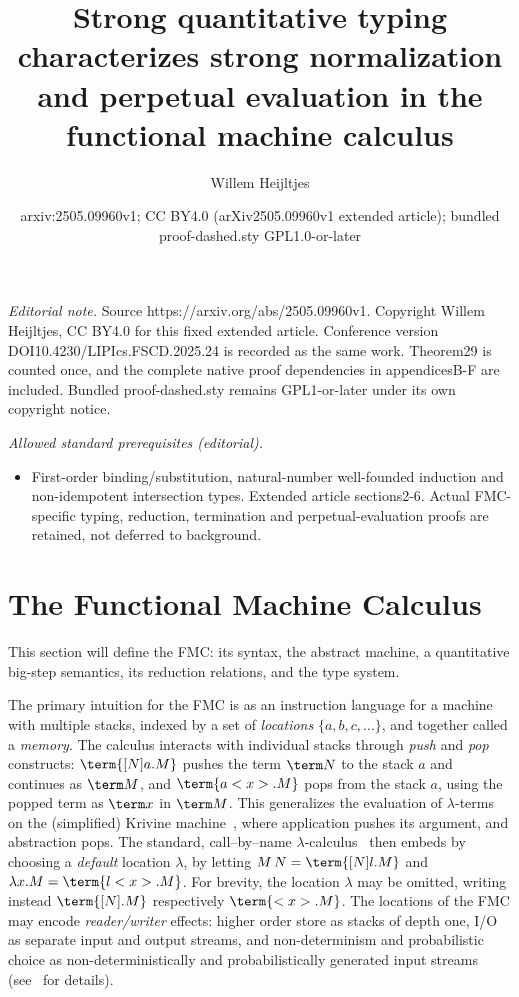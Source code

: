 \documentclass[10pt,a4paper]{amsart}
\title{Strong quantitative typing characterizes strong normalization and perpetual evaluation in the functional machine calculus}
\author{Willem Heijltjes}
\date{arxiv:2505.09960v1; CC BY4.0 (arXiv2505.09960v1 extended article); bundled proof-dashed.sty GPL1.0-or-later}
\begin{document}
\maketitle
\setcounter{section}{1}
\noindent\textit{Editorial note.} Source https://arxiv.org/abs/2505.09960v1. Copyright Willem Heijltjes, CC BY4.0 for this fixed extended article. Conference version DOI10.4230/LIPIcs.FSCD.2025.24 is recorded as the same work. Theorem29 is counted once, and the complete native proof dependencies in appendicesB-F are included. Bundled proof-dashed.sty remains GPL1-or-later under its own copyright notice.\par\medskip
\noindent\textit{Allowed standard prerequisites (editorial).}\begin{itemize}
\item First-order binding/substitution, natural-number well-founded induction and non-idempotent intersection types. Extended article sections2-6. Actual FMC-specific typing, reduction, termination and perpetual-evaluation proofs are retained, not deferred to background.
\end{itemize}\medskip
\section{The Functional Machine Calculus}
\label{sec:FMC}

This section will define the FMC: its syntax, the abstract machine, a quantitative big-step semantics, its reduction relations, and the type system. 

The primary intuition for the FMC is as an instruction language for a machine with multiple stacks, indexed by a set of \emph{locations} $\{a,b,c,\dots\}$, and together called a \emph{memory}. The calculus interacts with individual stacks through \emph{push} and \emph{pop} constructs: $\term{[N]a.M}$ pushes the term $\term N$ to the stack $a$ and continues as $\term M$, and $\term{a<x>.M}$ pops from the stack $a$, using the popped term as $\term x$ in $\term M$. This generalizes the evaluation of $\lambda$-terms on the (simplified) Krivine machine~\cite{Krivine-2007}, where application pushes its argument, and abstraction pops. The standard, call--by--name $\lambda$-calculus~\cite{Plotkin-1975} then embeds by choosing a \emph{default} location $\lambda$, by letting $M\,N=\term{[N]l.M}$ and $\lambda x.M=\term{l<x>.M}$. For brevity, the location $\lambda$ may be omitted, writing instead $\term{[N].M}$ respectively $\term{<x>.M}$. The locations of the FMC may encode \emph{reader/writer} effects: higher order store as stacks of depth one, I/O as separate input and output streams, and non-determinism and probabilistic choice as non-deterministically and probabilistically generated input streams (see~\cite{Heijltjes-2022} for details).
\end{document}
